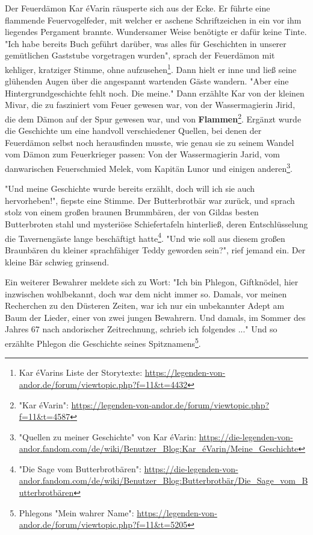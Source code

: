 Der Feuerdämon Kar éVarin räusperte sich aus der Ecke. Er führte eine flammende Feuervogelfeder, mit welcher er aschene Schriftzeichen in ein vor ihm liegendes Pergament brannte. Wundersamer Weise benötigte er dafür keine Tinte.
"Ich habe bereits Buch geführt darüber, was alles für Geschichten in unserer gemütlichen Gaststube vorgetragen wurden", sprach der Feuerdämon mit kehliger, kratziger Stimme, ohne aufzusehen\footnote{Kar éVarins Liste der Storytexte: \url{https://legenden-von-andor.de/forum/viewtopic.php?f=11&t=4432}}. Dann hielt er inne und ließ seine glühenden Augen über die angespannt wartenden Gäste wandern. "Aber eine Hintergrundgeschichte fehlt noch. Die meine." Dann erzählte Kar von der kleinen Mivar, die zu fasziniert vom Feuer gewesen war, von der Wassermagierin Jirid, die dem Dämon auf der Spur gewesen war, und von \textbf{Flammen}\footnote{"Kar éVarin": \url{https://legenden-von-andor.de/forum/viewtopic.php?f=11&t=4587}}. Ergänzt wurde die Geschichte um eine handvoll verschiedener Quellen, bei denen der Feuerdämon selbst noch herausfinden musste, wie genau sie zu seinem Wandel vom Dämon zum Feuerkrieger passen: Von der Wassermagierin Jarid, vom danwarischen Feuerschmied Melek, vom Kapitän Lunor und einigen anderen\footnote{"Quellen zu meiner Geschichte" von Kar éVarin: \url{https://die-legenden-von-andor.fandom.com/de/wiki/Benutzer_Blog:Kar_éVarin/Meine_Geschichte}}.

"Und meine Geschichte wurde bereits erzählt, doch will ich sie auch hervorheben!", fiepste eine Stimme. Der Butterbrotbär war zurück, und sprach stolz von einem großen braunen Brummbären, der von Gildas besten Butterbroten stahl und mysteriöse Schiefertafeln hinterließ, deren Entschlüsselung die Tavernengäste lange beschäftigt hatte\footnote{"Die Sage vom Butterbrotbären": \url{https://die-legenden-von-andor.fandom.com/de/wiki/Benutzer_Blog:Butterbrotbär/Die_Sage_vom_Butterbrotbären}}. "Und wie soll aus diesem großen Braunbären du kleiner sprachfähiger Teddy geworden sein?", rief jemand ein. Der kleine Bär schwieg grinsend.

Ein weiterer Bewahrer meldete sich zu Wort: "Ich bin Phlegon, Giftknödel, hier inzwischen wohlbekannt, doch war dem nicht immer so. Damals, vor meinen Recherchen zu den Düsteren Zeiten, war ich nur ein unbekannter Adept am Baum der Lieder, einer von zwei jungen Bewahrern. Und damals, im Sommer des Jahres 67 nach andorischer Zeitrechnung, schrieb ich folgendes ..." Und so erzählte Phlegon die Geschichte seines Spitznamens\footnote{Phlegons "Mein wahrer Name": \url{https://legenden-von-andor.de/forum/viewtopic.php?f=11&t=5205}}.

